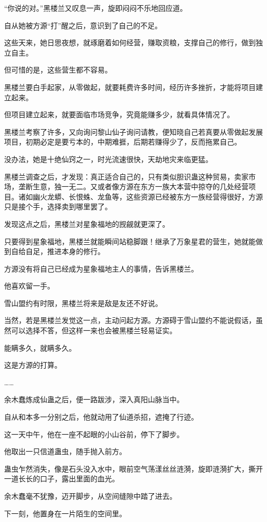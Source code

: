 \begin{this_body}
“你说的对。”黑楼兰又叹息一声，旋即闷闷不乐地回应道。

自从她被方源“打”醒之后，意识到了自己的不足。

这些天来，她日思夜想，就琢磨着如何经营，赚取资粮，支撑自己的修行，做到独立自主。

但可惜的是，这些营生都不容易。

黑楼兰要白手起家，从零做起，就要耗费许多时间，经历许多挫折，才能将项目建立起来。

但项目建立起来，就要面临市场竞争，究竟能赚多少，就看具体情况了。

黑楼兰考察了许多，又向询问黎山仙子询问请教，便知晓自己若真要从零做起发展项目，初期必定是要亏本的，中期难捱，后期若赚得少了，反而拖累自己。

没办法，她是十绝仙窍之一，时光流速很快，天劫地灾来临更猛。

黑楼兰调查之后，才发现：真正适合自己的，只有类似胆识蛊这种贸易，卖家市场，垄断生意，独一无二。又或者像方源在东方一族大本营中掠夺的几处经营项目。诸如幽火龙蟒、长恨蛛、龙鱼等，这些资源已经被东方一族经营得很好，方源只是接个手，选择卖到哪里罢了。

发现这点之后，黑楼兰对星象福地的觊觎就更深了。

只要得到星象福地，黑楼兰就能瞬间站稳脚跟！继承了万象星君的营生，她就能做到自给自足，推进本身的修行。

方源没有将自己已经成为星象福地主人的事情，告诉黑楼兰。

他喜欢留一手。

雪山盟约有时限，黑楼兰将来是敌是友还不好说。

当然，若是黑楼兰发觉这一点，主动问起方源。方源碍于雪山盟约不能说假话，虽然可以选择不答，但这样一来也会被黑楼兰轻易证实。

能瞒多久，就瞒多久。

这是方源的打算。

……

余木蠢炼成仙蛊之后，便一路跋涉，深入真阳山脉当中。

自从和本多一分别之后，他就动用了仙道杀招，遮掩了行迹。

这一天中午，他在一座不起眼的小山谷前，停下了脚步。

他取出一只信道蛊虫，随手抛入前方。

蛊虫乍然消失，像是石头没入水中，眼前空气荡漾丝丝涟漪，旋即涟漪扩大，撕开一道长长的口子，露出里面的血光。

余木蠢毫不犹豫，迈开脚步，从空间缝隙中踏了进去。

下一刻，他置身在一片陌生的空间里。


\end{this_body}
